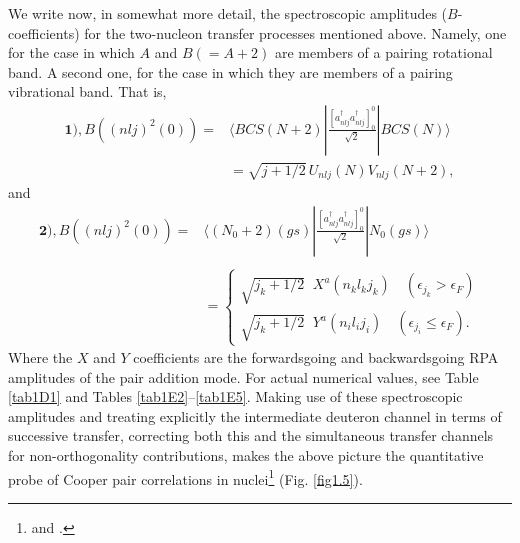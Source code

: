 We write now, in somewhat more detail, the spectroscopic amplitudes ($B$-coefficients) for the two-nucleon transfer processes mentioned above. Namely, one for the case in which $A$ and $B(=A+2)$ are members of a pairing rotational band. A second one, for the case in which they are members of a pairing vibrational band. That is, 
\begin{equation}\label{eqC21.8}
\begin{split}
\mathbf{1)}, B((nlj)^2(0))=&\langle BCS(N+2)|\frac{[a^\dagger_{nlj}a^\dagger_{nlj}]^0_0}{\sqrt{2}}|BCS(N)\rangle\\
&=\sqrt{j+1/2}\,U_{nlj}(N)V_{nlj}(N+2),
\end{split}
\end{equation}
and
\begin{equation}
\begin{split}
\mathbf{2)}, B((nlj)^2(0))=&\langle (N_0+2)(gs)|\frac{[a^\dagger_{nlj}a^\dagger_{nlj}]^0_0}{\sqrt{2}}|N_0(gs)\rangle \\
&\\
&=\left\{\begin{array}{c}
\sqrt{j_k+1/2}\;\;X^a(n_kl_kj_k)\quad (\epsilon_{j_k}>\epsilon_F) \\ 
\sqrt{j_k+1/2}\;\;Y^a(n_il_ij_i)\quad (\epsilon_{j_i}\leq\epsilon_F).
\end{array} \right.
\end{split}
\end{equation}
Where the $X$ and $Y$ coefficients are the forwardsgoing and backwardsgoing RPA amplitudes of the pair addition mode.
For actual numerical values, see Table \ref{tab1D1} and  Tables \ref{tab1E2}--\ref{tab1E5}. Making use of these spectroscopic amplitudes and treating explicitly the intermediate deuteron channel in terms of successive transfer, correcting both this and the simultaneous transfer channels for non-orthogonality contributions, makes the above picture the quantitative probe of Cooper pair correlations in nuclei\footnote{\cite{Bayman:82} and \cite{Potel:13}.}  (Fig. \ref{fig1.5}).

